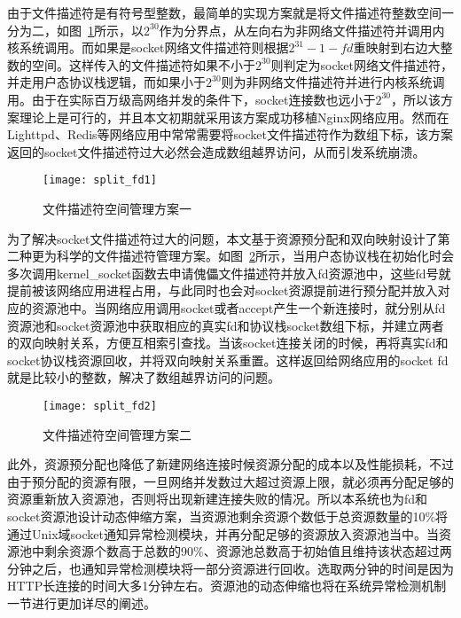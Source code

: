 由于文件描述符是有符号型整数，最简单的实现方案就是将文件描述符整数空间一分为二，如图~\ref{fig:split_fd1}所示，以$2^{30}$作为分界点，从左向右为非网络文件描述符并调用内核系统调用。而如果是socket网络文件描述符则根据$2^{31}-1 - fd$重映射到右边大整数的空间。这样传入的文件描述符如果不小于$2^{30}$则判定为socket网络文件描述符，并走用户态协议栈逻辑，而如果小于$2^{30}$则为非网络文件描述符并进行内核系统调用。由于在实际百万级高网络并发的条件下，socket连接数也远小于$2^{30}$，所以该方案理论上是可行的，并且本文初期就采用该方案成功移植Nginx网络应用。然而在Lighttpd、Redis等网络应用中常常需要将socket文件描述符作为数组下标，该方案返回的socket文件描述符过大必然会造成数组越界访问，从而引发系统崩溃。

\vspace{-10pt}
\begin{figure}[H] %
  \centering
  \texttt{[image: split\_fd1]}
  \caption{文件描述符空间管理方案一}
  \label{fig:split_fd1}
\end{figure}
\vspace{-10pt}

为了解决socket文件描述符过大的问题，本文基于资源预分配和双向映射设计了第二种更为科学的文件描述符管理方案。如图~\ref{fig:split_fd2}所示，当用户态协议栈在初始化时会多次调用kernel\_socket函数去申请傀儡文件描述符并放入fd资源池中，这些fd号就提前被该网络应用进程占用，与此同时也会对socket资源提前进行预分配并放入对应的资源池中。当网络应用调用socket或者accept产生一个新连接时，就分别从fd资源池和socket资源池中获取相应的真实fd和协议栈socket数组下标，并建立两者的双向映射关系，方便互相索引查找。当该socket连接关闭的时候，再将真实fd和socket协议栈资源回收，并将双向映射关系重置。这样返回给网络应用的socket fd就是比较小的整数，解决了数组越界访问的问题。
\vspace{-10pt}
\begin{figure}[H] %
  \centering
  \texttt{[image: split\_fd2]}
  \caption{文件描述符空间管理方案二}
  \label{fig:split_fd2}
\end{figure}
\vspace{-10pt}

此外，资源预分配也降低了新建网络连接时候资源分配的成本以及性能损耗，不过由于预分配的资源有限，一旦网络并发数过大超过资源上限，就必须再分配足够的资源重新放入资源池，否则将出现新建连接失败的情况。所以本系统也为fd和socket资源池设计动态伸缩方案，当资源池剩余资源个数低于总资源数量的10\%将通过Unix域socket通知异常检测模块，并再分配足够的资源放入资源池当中。当资源池中剩余资源个数高于总数的90\%、资源池总数高于初始值且维持该状态超过两分钟之后，也通知异常检测模块将一部分资源进行回收。选取两分钟的时间是因为HTTP长连接的时间大多1分钟左右。资源池的动态伸缩也将在系统异常检测机制一节进行更加详尽的阐述。

